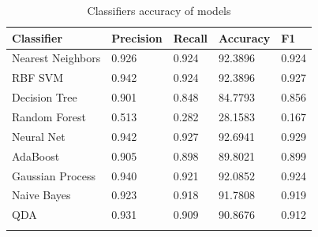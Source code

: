 \documentclass[sn-mathphys,Numbered]{sn-jnl}%
\theoremstyle{thmstyleone}%
\theoremstyle{thmstyletwo}%
\theoremstyle{thmstylethree}%
\begin{document}
\begin{table}[h!]
\begin{center}
\begin{minipage}{174pt}
\caption{Classifiers accuracy of models}\label{tab1_classifiers}%
\begin{tabular}{@{}lllll@{}}
\toprule
Classifier & Precision & Recall & Accuracy & F1 \\
\midrule
Nearest Neighbors & 0.926 & 0.924 & 92.3896 & 0.924\\
RBF SVM & 0.942 & 0.924 & 92.3896 & 0.927\\
Decision Tree & 0.901 & 0.848 & 84.7793 & 0.856\\
Random Forest & 0.513 & 0.282 & 28.1583 & 0.167\\
Neural Net & 0.942 & 0.927 & 92.6941 & 0.929\\
AdaBoost & 0.905 & 0.898 & 89.8021 & 0.899\\
Gaussian Process & 0.940 & 0.921 & 92.0852 & 0.924\\
Naive Bayes & 0.923 & 0.918 & 91.7808 & 0.919\\
QDA & 0.931 & 0.909 & 90.8676 & 0.912\\
\botrule
\end{tabular}
\footnotetext{}
\end{minipage}
\end{center}
\end{table}
\end{document}
